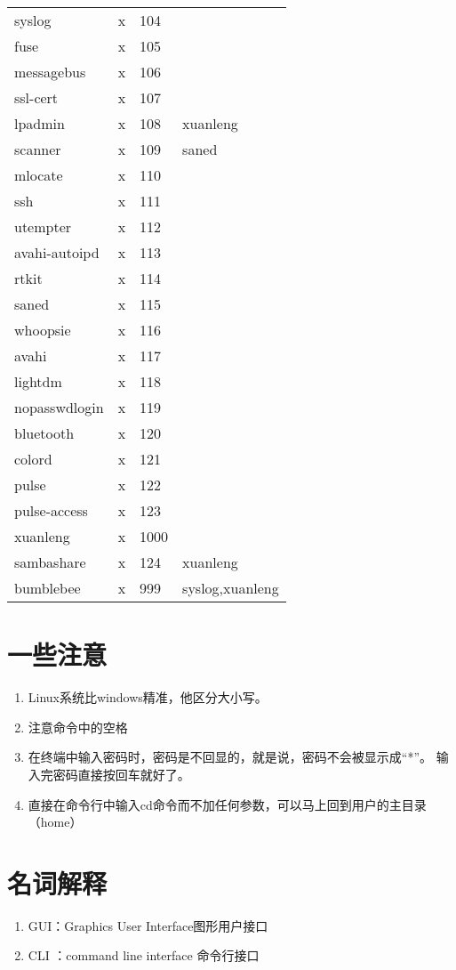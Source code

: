 {\begin{center}
\begin{longtable}{|l|l|l|l|}
syslog&x&104&\\
fuse&x&105&\\
messagebus&x&106&\\
ssl-cert&x&107&\\
lpadmin&x&108&xuanleng\\
scanner&x&109&saned\\
mlocate&x&110&\\
ssh&x&111&\\
utempter&x&112&\\
avahi-autoipd&x&113&\\
rtkit&x&114&\\
saned&x&115&\\
whoopsie&x&116&\\
avahi&x&117&\\
lightdm&x&118&\\
nopasswdlogin&x&119&\\
bluetooth&x&120&\\
colord&x&121&\\
pulse&x&122&\\
pulse-access&x&123&\\
xuanleng&x&1000&\\
sambashare&x&124&xuanleng\\
bumblebee&x&999&syslog,xuanleng
\end{longtable}
\end{center}}



\section{一些注意}
\begin{enumerate}
\item Linux系统比windows精准，他区分大小写。
\item 注意命令中的空格
\item 在终端中输入密码时，密码是不回显的，就是说，密码不会被显示成“*”。
输入完密码直接按回车就好了。
\item 直接在命令行中输入cd命令而不加任何参数，可以马上回到用户的主目录（home）
\end{enumerate}


\section{名词解释}
\begin{enumerate}
\item GUI：Graphics User Interface图形用户接口 
\item CLI ：command line interface 命令行接口
\end{enumerate}







